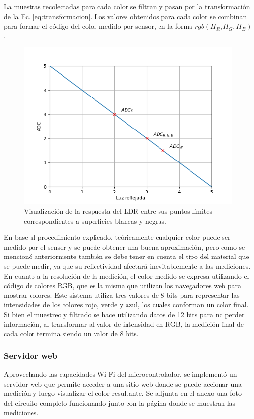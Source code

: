 \documentclass[12pt,a4paper,twoside,fleqn]{article}
\begin{document}
La muestras recolectadas para cada color se filtran y pasan por la transformación de la Ec. \eqref{eq:transformacion}. Los valores obtenidos para cada color se combinan para formar el código del color medido por sensor, en la forma $rgb(H_R, H_G, H_B)$.

\begin{figure}
    \centering
    \includegraphics[width=0.5\linewidth]{img/respuesta_ldr.png}
    \caption{Visualización de la respuesta del LDR entre sus puntos límites correspondientes a superficies blancas y negras.}
    \label{fig:respuesta_ldr}
\end{figure}

En base al procedimiento explicado, teóricamente cualquier color puede ser medido por el sensor y se puede obtener una buena aproximación, pero como se mencionó anteriormente también se debe tener en cuenta el tipo del material que se puede medir, ya que su reflectividad afectará inevitablemente a las mediciones. En cuanto a la resolución de la medición, el color medido se expresa utilizando el código de colores RGB, que es la misma que utilizan los navegadores web para mostrar colores. Este sistema utiliza tres valores de 8 bits para representar las intensidades de los colores rojo, verde y azul, los cuales conforman un color final. Si bien el muestreo y filtrado se hace utilizando datos de 12 bits para no perder información, al transformar al valor de intensidad en RGB, la medición final de cada color termina siendo un valor de 8 bits.

\subsubsection*{Servidor web}
Aprovechando las capacidades Wi-Fi del microcontrolador, se implementó un servidor web que permite acceder a una sitio web donde se puede accionar una medición y luego visualizar el color resultante. Se adjunta en el anexo una foto del circuito completo funcionando junto con la página donde se muestran las mediciones.
\end{document}
